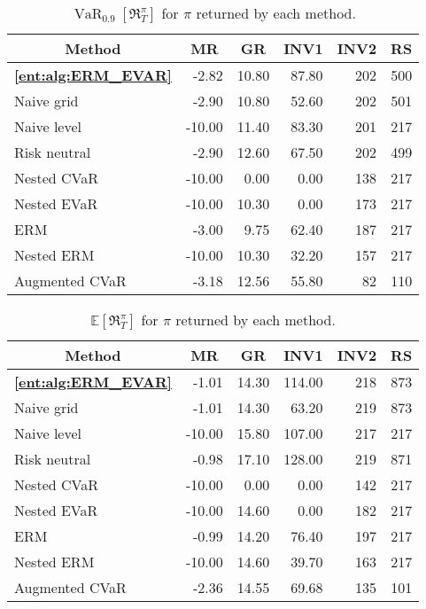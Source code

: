 \documentclass[twoside]{article}
\newcommand{\E}{\mathbb{E}}
\newcommand{\var}[2]{\operatorname{VaR}_{#1} \left[#2\right]}
\theoremstyle{plain}
\theoremstyle{definition}
\theoremstyle{remark}
\begin{document}
\begin{table}
    \caption{$\var{0.9}{\mathfrak{R}^{\pi}_{T}}$ for $\pi$ returned by each method.}
    \label{ent:tab:var_09}
    \centering
    \begin{tabular}{l|rrrrr}
      \toprule
    \multicolumn{1}{c|}{Method} & \multicolumn{1}{c}{MR} & \multicolumn{1}{c}{GR} &  \multicolumn{1}{c}{INV1} & \multicolumn{1}{c}{INV2} & \multicolumn{1}{c}{RS}  \\
      \midrule
      \textbf{\cref{ent:alg:ERM_EVAR}}  & -2.82 & 10.80 & 87.80 & 202 & 500 \\ 
      Naive grid & -2.90 & 10.80 & 52.60 & 202 & 501 \\ 
      Naive level & -10.00 & 11.40 & 83.30 & 201 & 217 \\ 
      \midrule
      Risk neutral & -2.90 & 12.60 & 67.50 & 202 & 499 \\ 
      Nested CVaR & -10.00 & 0.00 & 0.00 & 138 & 217 \\ 
      Nested EVaR & -10.00 & 10.30 & 0.00 & 173 & 217 \\ 
      ERM & -3.00 & 9.75 & 62.40 & 187 & 217 \\ 
      Nested ERM & -10.00 & 10.30 & 32.20 & 157 & 217 \\ 
      \midrule
      Augmented CVaR & -3.18 & 12.56 & 55.80 & 82 & 110 \\
      \bottomrule
    \end{tabular}
\end{table}
\begin{table}
    \caption{$\E\left[\mathfrak{R}^{\pi}_{T}\right]$ for $\pi$ returned by each method.}
    \label{ent:tab:exp}
    \centering
    \begin{tabular}{l|rrrrr}
      \toprule
    \multicolumn{1}{c|}{Method} & \multicolumn{1}{c}{MR} & \multicolumn{1}{c}{GR} &  \multicolumn{1}{c}{INV1} & \multicolumn{1}{c}{INV2} & \multicolumn{1}{c}{RS}  \\
      \midrule
       \textbf{\cref{ent:alg:ERM_EVAR}} & -1.01 & 14.30 & 114.00 & 218 & 873 \\ 
       Naive grid & -1.01 & 14.30 & 63.20 & 219 & 873 \\ 
       Naive level & -10.00 & 15.80 & 107.00 & 217 & 217 \\ 
      \midrule
       Risk neutral & -0.98 & 17.10 & 128.00 & 219 & 871 \\ 
       Nested CVaR & -10.00 & 0.00 & 0.00 & 142 & 217 \\ 
       Nested EVaR & -10.00 & 14.60 & 0.00 & 182 & 217 \\ 
       ERM & -0.99 & 14.20 & 76.40 & 197 & 217 \\ 
       Nested ERM & -10.00 & 14.60 & 39.70 & 163 & 217 \\ 
      \midrule
      Augmented CVaR & -2.36 & 14.55 & 69.68 & 135 & 101 \\
      \bottomrule
    \end{tabular}
\end{table}
\end{document}
